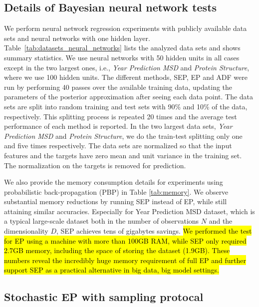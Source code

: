 \documentclass{article} %
\begin{document}
\subsection{Details of Bayesian neural network tests}

We perform neural network regression experiments with publicly available data sets and neural networks with one hidden layer.  Table~\ref{tab:datasets_neural_networks} lists the analyzed data sets and shows summary statistics.  We use neural networks with 50 hidden units in all cases except in the two largest ones, i.e., \emph{Year Prediction
MSD} and \emph{Protein Structure}, where we use 100 hidden units. The different methods, SEP, EP and ADF were run by performing 40 passes over the available training data, updating the parameters of the posterior approximation after seeing each data point.  The data sets are split into random training and test sets with 90\% and 10\% of the data, respectively. This splitting process is repeated 20 times and the average test performance of each method is reported. In the two largest data sets, \emph{Year Prediction MSD} and \emph{Protein Structure}, we do the train-test splitting only one and five times respectively. The data sets are normalized so that the input features and the targets have zero mean and unit variance in the training set. The normalization on the targets is removed for prediction.

We also provide the memory consumption details for experiments using probabilistic back-propagation (PBP) in Table \ref{tab:memory}. We observe substantial memory reductions by running SEP instead of EP, while still attaining similar accuracies. Especially for Year Prediction MSD dataset, which is a typical large-scale dataset both in the number of observations $N$ and the dimensionality $D$, SEP achieves tens of gigabytes savings. \hl{We performed the test for EP using a machine with more than 100GB RAM, while SEP only required 2.7GB memory, including the space of storing the dataset (1.9GB). These numbers reveal the incredibly huge memory requirement of full EP and further support SEP as a practical alternative in big data, big model settings.}

\subsection{Stochastic EP with sampling protocal}
\end{document}
